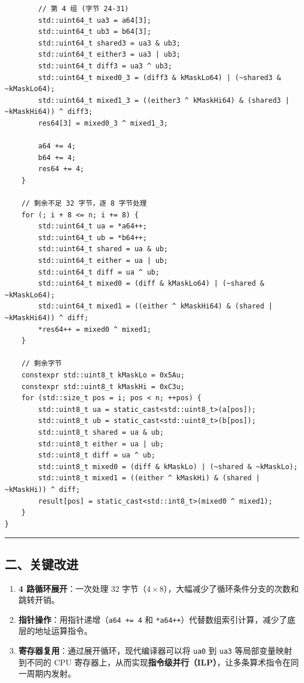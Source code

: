 \documentclass[11pt, a4paper]{article}
\begin{document}
\begin{aibox}
\begin{tcolorbox}[colback=white,colframe=gray!50!white,boxrule=0.5pt,arc=2pt,left=5pt,right=5pt,top=5pt,bottom=5pt]
\begin{verbatim}
        // 第 4 组 (字节 24-31)
        std::uint64_t ua3 = a64[3];
        std::uint64_t ub3 = b64[3];
        std::uint64_t shared3 = ua3 & ub3;
        std::uint64_t either3 = ua3 | ub3;
        std::uint64_t diff3 = ua3 ^ ub3;
        std::uint64_t mixed0_3 = (diff3 & kMaskLo64) | (~shared3 & ~kMaskLo64);
        std::uint64_t mixed1_3 = ((either3 ^ kMaskHi64) & (shared3 | ~kMaskHi64)) ^ diff3;
        res64[3] = mixed0_3 ^ mixed1_3;
        
        a64 += 4;
        b64 += 4;
        res64 += 4;
    }
    
    // 剩余不足 32 字节，逐 8 字节处理
    for (; i + 8 <= n; i += 8) {
        std::uint64_t ua = *a64++;
        std::uint64_t ub = *b64++;
        std::uint64_t shared = ua & ub;
        std::uint64_t either = ua | ub;
        std::uint64_t diff = ua ^ ub;
        std::uint64_t mixed0 = (diff & kMaskLo64) | (~shared & ~kMaskLo64);
        std::uint64_t mixed1 = ((either ^ kMaskHi64) & (shared | ~kMaskHi64)) ^ diff;
        *res64++ = mixed0 ^ mixed1;
    }
    
    // 剩余字节
    constexpr std::uint8_t kMaskLo = 0x5Au;
    constexpr std::uint8_t kMaskHi = 0xC3u;
    for (std::size_t pos = i; pos < n; ++pos) {
        std::uint8_t ua = static_cast<std::uint8_t>(a[pos]);
        std::uint8_t ub = static_cast<std::uint8_t>(b[pos]);
        std::uint8_t shared = ua & ub;
        std::uint8_t either = ua | ub;
        std::uint8_t diff = ua ^ ub;
        std::uint8_t mixed0 = (diff & kMaskLo) | (~shared & ~kMaskLo);
        std::uint8_t mixed1 = ((either ^ kMaskHi) & (shared | ~kMaskHi)) ^ diff;
        result[pos] = static_cast<std::int8_t>(mixed0 ^ mixed1);
    }
}
\end{verbatim}
\end{tcolorbox}

\begin{center}\rule{\textwidth}{0.4pt}\end{center}

\subsection*{二、关键改进}

\begin{enumerate}
    \item \textbf{4 路循环展开}：一次处理 32 字节（$4 \times 8$），大幅减少了循环条件分支的次数和跳转开销。
    \item \textbf{指针操作}：用指针递增（\texttt{a64 += 4} 和 \texttt{*a64++}）代替数组索引计算，减少了底层的地址运算指令。
    \item \textbf{寄存器复用}：通过展开循环，现代编译器可以将 \texttt{ua0} 到 \texttt{ua3} 等局部变量映射到不同的 CPU 寄存器上，从而实现\textbf{指令级并行（ILP）}，让多条算术指令在同一周期内发射。
\end{enumerate}


\end{aibox}
\end{document}
